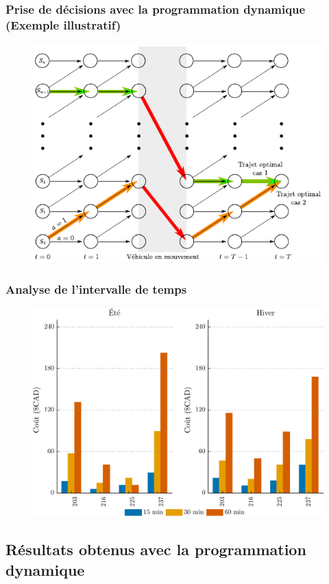 \documentclass[french]{beamer}
\begin{document}
{\begin{frame}
\frametitle{Prise de décisions avec la programmation dynamique (Exemple illustratif)}
\begin{center}
\begin{figure}
\includegraphics[width=0.7\linewidth]{figDinamycProgram02.pdf}
\end{figure} 
 \end{center}
\end{frame}


\begin{frame}
\frametitle{Analyse de l'intervalle de temps}
\begin{center}
\begin{figure}
\includegraphics[angle=90,width=0.9\linewidth]{figresDeltaWithoutGasBWcolor02-Sout2.pdf}
\end{figure} 
 \end{center}
\end{frame}

\subsection{Résultats obtenus avec la programmation dynamique}

}
\end{document}
